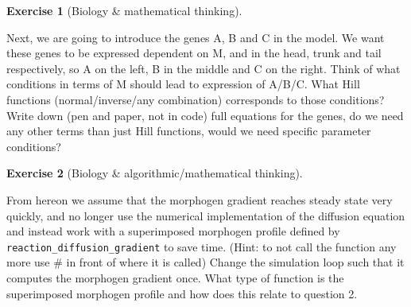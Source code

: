 \documentclass[
  letterpaper,
  DIV=11,
  numbers=noendperiod]{scrreprt}
\theoremstyle{definition}
\newtheorem{exercise}{Exercise}[chapter]
\theoremstyle{remark}
\begin{document}
\begin{exercise}[Biology \& mathematical
thinking]\protect\hypertarget{exr-plain}{}\label{exr-plain}

Next, we are going to introduce the genes A, B and C in the model. We
want these genes to be expressed dependent on M, and in the head, trunk
and tail respectively, so A on the left, B in the middle and C on the
right. Think of what conditions in terms of M should lead to expression
of A/B/C. What Hill functions (normal/inverse/any combination)
corresponds to those conditions? Write down (pen and paper, not in code)
full equations for the genes, do we need any other terms than just Hill
functions, would we need specific parameter conditions?

\end{exercise}

\begin{exercise}[Biology \& algorithmic/mathematical
thinking]\protect\hypertarget{exr-plain}{}\label{exr-plain}

From hereon we assume that the morphogen gradient reaches steady state
very quickly, and no longer use the numerical implementation of the
diffusion equation and instead work with a superimposed morphogen
profile defined by \texttt{reaction\_diffusion\_gradient} to save time.
(Hint: to not call the function any more use \# in front of where it is
called) Change the simulation loop such that it computes the morphogen
gradient once. What type of function is the superimposed morphogen
profile and how does this relate to question 2.

\end{exercise}
\end{document}
